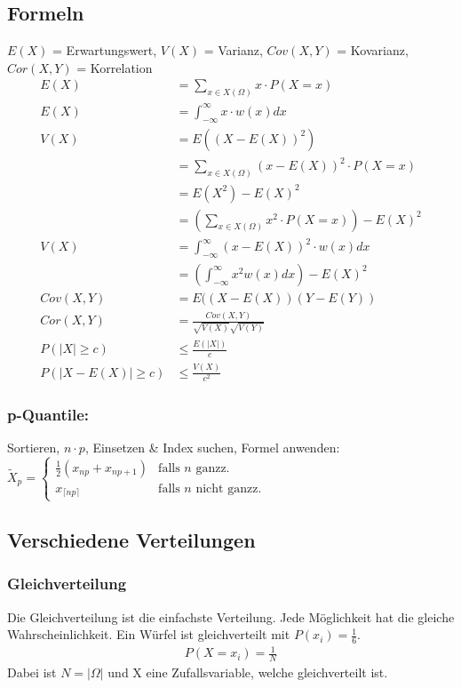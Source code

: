 \documentclass[a4paper, 8pt, landscape]{extarticle}
\let\oldint\int
\renewcommand{\int}{\ensuremath{\textstyle\oldint}}
\let\oldsum\sum
\renewcommand{\sum}{\ensuremath{\textstyle\oldsum}}
\begin{document}
\begin{multicols*}{5}
	    \subsection{Formeln}
		    $E(X)$ = Erwartungswert, $V(X)$ = Varianz, $Cov(X,Y)$ = Kovarianz, $Cor(X,Y)$ = Korrelation
		    \begin{align*}
		    	E(X) &= \sum_{x \in X(\Omega)} x \cdot P(X = x)\\
		    	E(X) &= \int_{-\infty}^{\infty} x \cdot w(x) dx\\
		    	V(X) &= E((X-E(X))^2)\\
		    	&= \sum_{x \in X(\Omega)} (x - E(X))^2 \cdot P(X = x)\\
		    	&= E(X^2)-E(X)^2\\
			    &= \left(\sum_{x \in X(\Omega)} x^2 \cdot P(X = x)\right) - E(X)^2\\
		    	V(X) &= \int_{-\infty}^{\infty} (x - E(X))^2 \cdot w(x) dx\\
		    	&= \left(\int_{-\infty}^{\infty} x^2 w(x) dx \right) - E(X)^2	\\
		    	Cov(X,Y)&=E((X-E(X))(Y-E(Y))\\
		    	Cor(X,Y)&=\frac{Cov(X,Y)}{\sqrt{V(X)}\sqrt{V(Y)}}\\
		    	P(|X|\geq c) &\leq \frac{E(|X|)}{c}\\
		    	P(|X-E(X)|\geq c)&\leq\frac{V(X)}{c^2}
		    \end{align*}
		    \subsubsection{p-Quantile:}
		    Sortieren, $n\cdot p$, Einsetzen \& Index suchen, Formel anwenden:\\
			$\widetilde{X}_p=
			\begin{cases}
			\frac{1}{2}(x_{np}+x_{np+1}) & \text{falls } n \text{ ganzz.}\\
			x_{\lceil{np}\rceil} & \text{falls } n \text{ nicht ganzz.}
			\end{cases}$
	    \subsection{Verschiedene Verteilungen}
			\subsubsection{Gleichverteilung}	
				Die Gleichverteilung ist die einfachste Verteilung. Jede Möglichkeit hat die gleiche Wahrscheinlichkeit. Ein Würfel ist gleichverteilt mit $P(x_i) = \frac{1}{6}$.\\
				\begin{align*}
					P(X = x_i) = \frac{1}{N}
				\end{align*}
				Dabei ist $N = |\Omega|$ und X eine Zufallsvariable, welche gleichverteilt ist.

\end{multicols*}
\end{document}
